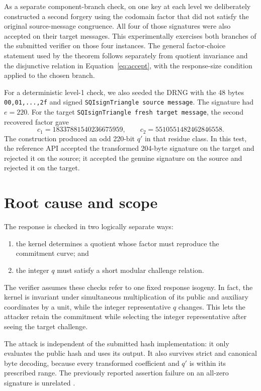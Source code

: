 \documentclass[11pt,a4paper]{article}
\begin{document}
As a separate component-branch check, on one key at each level we deliberately
constructed a second forgery using the codomain factor that did not satisfy
the original source-message congruence. All four of those signatures were
also accepted on their target messages. This experimentally exercises both
branches of the submitted verifier on those four instances. The general
factor-choice statement used by the theorem follows separately from quotient
invariance and the disjunctive relation in Equation~\eqref{eq:accept}, with
the response-size condition applied to the chosen branch.

For a deterministic level-1 check, we also seeded the DRNG with the 48 bytes
\texttt{00,01,...,2f} and signed
\texttt{SQIsignTriangle source message}. The signature had $e=220$. For the
target \texttt{SQIsignTriangle fresh target message}, the second recovered
factor gave
\[
 c_1=18337881540236675959,
 \qquad c_2=5510551482462846558.
\]
The construction produced an odd 220-bit $q'$ in that residue class. In this
test, the reference API accepted the transformed 204-byte signature on the
target and rejected it on the source; it accepted the genuine signature on
the source and rejected it on the target.

\section{Root cause and scope}

The response is checked in two logically separate ways:
\begin{enumerate}[leftmargin=2em]
  \item the kernel determines a quotient whose factor must reproduce the
        commitment curve; and
  \item the integer $q$ must satisfy a short modular challenge relation.
\end{enumerate}
The verifier assumes these checks refer to one fixed response isogeny. In
fact, the kernel is invariant under simultaneous multiplication of its public
and auxiliary coordinates by a unit, while the integer representative $q$
changes. This lets the attacker retain the commitment while selecting the
integer representative after seeing the target challenge.

The attack is independent of the submitted hash implementation: it only
evaluates the public hash and uses its output. It also survives strict and
canonical byte decoding, because every transformed coefficient and $q'$ is
within its prescribed range. The previously reported assertion failure on an
all-zero signature is unrelated \cite{ngcc-tracker}.
\end{document}
